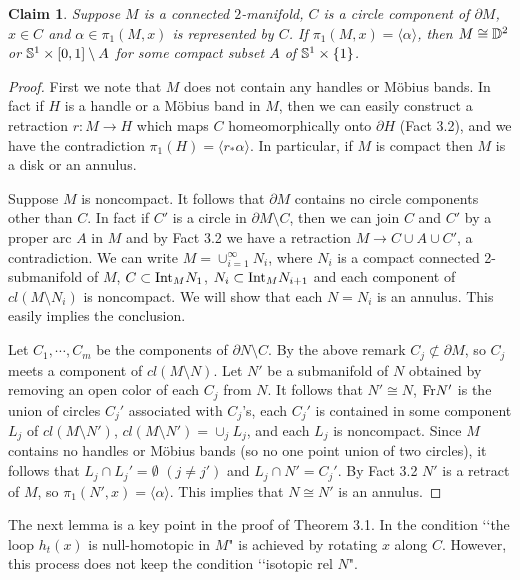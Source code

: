 \documentclass[11pt]{amsart}
\newtheorem*{claim}{Claim}
\theoremstyle{definition}
\newtheorem*{Proof of Theorem 3.1}{Proof of Theorem 3.1}
\newtheorem*{Proof of Corollary 3.1}{Proof of Corollary 3.1}
\newtheorem*{Proof of Proposition 4.1.(1)}{Proof of Proposition 4.1.(1)}
\newtheorem*{Proof of Proposition 4.1.(2)}{Proof of Proposition 4.1.(2)}
\newtheorem*{Proof of Corollary 1.1}{Proof of Corollary 1.1}
\begin{document}
\begin{claim}
Suppose $M$ is a connected $2$-manifold, $C$ is a circle component of $\partial M$, $x \in C$ and $\alpha \in \pi_1(M, x)$ is represented by $C$. If $\pi_1(M, x) = \langle \alpha \rangle$, then $M \cong {\Bbb D}^2$ or ${\Bbb S}^1 \times [0, 1] \setminus A$ for some compact subset $A$ of ${\Bbb S}^1 \times \{ 1 \}$.
\end{claim}

\begin{proof}
First we note that $M$ does not contain any handles or M\"obius bands. In fact if $H$ is a handle or a M\"obius band in $M$, then we can easily construct a retraction $r : M \to H$ which maps $C$ homeomorphically onto $\partial H$ (Fact 3.2), and we have the contradiction $\pi_1(H) = \langle r_{\ast}\alpha \rangle$. In particular, if $M$ is compact then $M$ is a disk or an annulus.

Suppose $M$ is noncompact. It follows that $\partial M$ contains no circle components other than $C$. In fact if $C'$ is a circle in $\partial M \setminus C$, then we can join $C$ and $C'$ by a proper arc $A$ in $M$ and by Fact 3.2 we have a retraction $M \to C \cup A \cup C'$, a contradiction. We can write $M = \cup_{i = 1}^\infty N_i$, where $N_i$ is a compact connected 2-submanifold of $M$, $C \subset {\rm Int}_M N_1$, $N_i \subset {\rm Int}_M N_{i+1}$ and each component of $cl(M \setminus N_i)$ is 
noncompact. We will show that each $N = N_i$ is an annulus. This easily implies the conclusion.

Let $C_1, \cdots, C_m$ be the components of $\partial N \setminus C$. By the above remark $C_j \not\subset \partial M$, so $C_j$ meets a component of $cl(M \setminus N)$. Let $N'$ be a submanifold of $N$ obtained by removing an open color of each $C_j$ from $N$. It follows that $N' \cong N$, ${\rm Fr}N'$ is the union of circles $C_j'$ associated with $C_j$'s, each $C_j'$ is contained in some component $L_j$ of $cl(M \setminus N')$, $cl(M \setminus N') = \cup_j L_j$, and each $L_j$ is noncompact. Since $M$ contains no handles or M\"obius bands (so no one point union of two circles), it follows that $L_j \cap L_j' = \emptyset$ $(j \neq j')$ and $L_j \cap N' = C_j'$. By Fact 3.2 $N'$ is a retract of $M$, so $\pi_1(N', x) = \langle \alpha \rangle$. This implies that $N \cong N'$ is an annulus. 
\end{proof}

The next lemma is a key point in the proof of Theorem 3.1. In \cite[Lemma 6.1]{Ep} the condition \lq\lq the loop $h_t(x)$ is null-homotopic in $M$" is achieved by rotating $x$ along $C$. However, this process does not keep the condition \lq\lq isotopic rel $N$".
\end{document}
